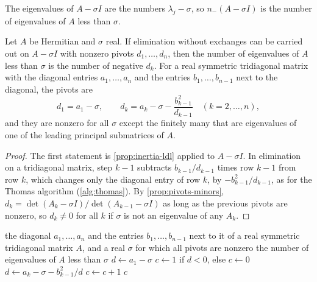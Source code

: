 The eigenvalues of $A-\sigma I$ are the numbers $\lambda_j-\sigma$, so $n_-(A-\sigma I)$ is the number of eigenvalues of $A$ less than $\sigma$.

\begin{proposition}
\label{prop:eigen-count}
Let $A$ be Hermitian and $\sigma$ real. If elimination without exchanges can be carried out on $A-\sigma I$ with nonzero pivots $d_1,\ldots,d_n$, then the number of eigenvalues of $A$ less than $\sigma$ is the number of negative $d_k$. For a real symmetric tridiagonal matrix with the diagonal entries $a_1,\ldots,a_n$ and the entries $b_1,\ldots,b_{n-1}$ next to the diagonal, the pivots are
\[
d_1=a_1-\sigma,\qquad d_k=a_k-\sigma-\frac{b_{k-1}^2}{d_{k-1}}\quad(k=2,\ldots,n),
\]
and they are nonzero for all $\sigma$ except the finitely many that are eigenvalues of one of the leading principal submatrices of $A$.
\end{proposition}

\begin{proof}
The first statement is \cref{prop:inertia-ldl} applied to $A-\sigma I$. In elimination on a tridiagonal matrix, step $k-1$ subtracts $b_{k-1}/d_{k-1}$ times row $k-1$ from row $k$, which changes only the diagonal entry of row $k$, by $-b_{k-1}^2/d_{k-1}$, as for the Thomas algorithm (\cref{alg:thomas}). By \cref{prop:pivots-minors}, $d_k=\det(A_k-\sigma I)/\det(A_{k-1}-\sigma I)$ as long as the previous pivots are nonzero, so $d_k\ne0$ for all $k$ if $\sigma$ is not an eigenvalue of any $A_k$.
\end{proof}

\begin{algorithm}
\begin{algorithmic}[1]
\Require the diagonal $a_1,\ldots,a_n$ and the entries $b_1,\ldots,b_{n-1}$ next to it of a real symmetric tridiagonal matrix $A$, and a real $\sigma$ for which all pivots are nonzero
\Ensure the number of eigenvalues of $A$ less than $\sigma$
\State $d\gets a_1-\sigma$
\State $c\gets1$ if $d<0$, else $c\gets0$
  \State $d\gets a_k-\sigma-b_{k-1}^2/d$ 
   $c\gets c+1$ \EndIf
\EndFor
\State \Return $c$
\end{algorithmic}
\caption{Counting the eigenvalues of a symmetric tridiagonal matrix below $\sigma$ by the signs of the pivots of $A-\sigma I$ (\cref{prop:eigen-count}). It costs about $4n$ operations. Since the count is a nondecreasing function of $\sigma$, bisection on $\sigma$ locates each eigenvalue to any accuracy.}
\label{alg:eigen-count}
\end{algorithm}

